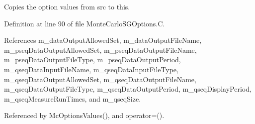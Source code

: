 Copies the option values from {\ttfamily src} to {\ttfamily this}. 



Definition at line 90 of file Monte\-Carlo\-S\-G\-Options.\-C.



References m\-\_\-data\-Output\-Allowed\-Set, m\-\_\-data\-Output\-File\-Name, m\-\_\-pseq\-Data\-Output\-Allowed\-Set, m\-\_\-pseq\-Data\-Output\-File\-Name, m\-\_\-pseq\-Data\-Output\-File\-Type, m\-\_\-pseq\-Data\-Output\-Period, m\-\_\-qseq\-Data\-Input\-File\-Name, m\-\_\-qseq\-Data\-Input\-File\-Type, m\-\_\-qseq\-Data\-Output\-Allowed\-Set, m\-\_\-qseq\-Data\-Output\-File\-Name, m\-\_\-qseq\-Data\-Output\-File\-Type, m\-\_\-qseq\-Data\-Output\-Period, m\-\_\-qseq\-Display\-Period, m\-\_\-qseq\-Measure\-Run\-Times, and m\-\_\-qseq\-Size.



Referenced by Mc\-Options\-Values(), and operator=().


